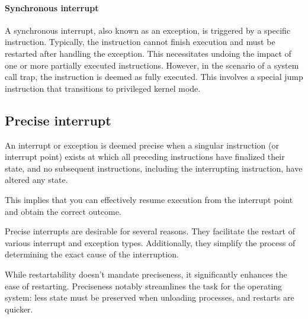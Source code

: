 \paragraph*{Synchronous interrupt}
A synchronous interrupt, also known as an exception, is triggered by a specific instruction.
Typically, the instruction cannot finish execution and must be restarted after handling the exception.
This necessitates undoing the impact of one or more partially executed instructions.
However, in the scenario of a system call trap, the instruction is deemed as fully executed.
This involves a special jump instruction that transitions to privileged kernel mode.

\subsection{Precise interrupt}
\begin{definition}
    An interrupt or exception is deemed precise when a singular instruction (or interrupt point) exists at which all preceding instructions have finalized their state, and no subsequent instructions, including the interrupting instruction, have altered any state.
\end{definition}
This implies that you can effectively resume execution from the interrupt point and obtain the correct outcome.

Precise interrupts are desirable for several reasons. 
They facilitate the restart of various interrupt and exception types. 
Additionally, they simplify the process of determining the exact cause of the interruption.

While restartability doesn't mandate preciseness, it significantly enhances the ease of restarting. 
Preciseness notably streamlines the task for the operating system: less state must be preserved when unloading processes, and restarts are quicker.